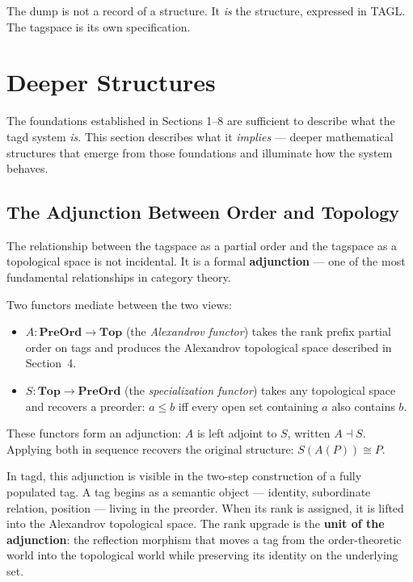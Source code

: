 \documentclass{article}
\begin{document}
The dump is not a record of a structure. It \emph{is} the structure, expressed
in TAGL. The tagspace is its own specification.

\section{Deeper Structures}

The foundations established in Sections 1--8 are sufficient to describe what
the tagd system \emph{is}. This section describes what it \emph{implies} ---
deeper mathematical structures that emerge from those foundations and illuminate
how the system behaves.

\subsection{The Adjunction Between Order and Topology}

The relationship between the tagspace as a partial order and the tagspace as a
topological space is not incidental. It is a formal \textbf{adjunction} --- one
of the most fundamental relationships in category theory.

Two functors mediate between the two views:

\begin{itemize}
  \item $A : \mathbf{PreOrd} \to \mathbf{Top}$ (the \emph{Alexandrov functor})
        takes the rank prefix partial order on tags and produces the Alexandrov
        topological space described in Section~4.
  \item $S : \mathbf{Top} \to \mathbf{PreOrd}$ (the \emph{specialization
        functor}) takes any topological space and recovers a preorder:
        $a \leq b$ iff every open set containing $a$ also contains $b$.
\end{itemize}

These functors form an adjunction: $A$ is left adjoint to $S$, written
$A \dashv S$. Applying both in sequence recovers the original structure:
$S(A(P)) \cong P$.

In tagd, this adjunction is visible in the two-step construction of a fully
populated tag. A tag begins as a semantic object --- identity, subordinate
relation, position --- living in the preorder. When its rank is assigned, it is
lifted into the Alexandrov topological space. The rank upgrade is the
\textbf{unit of the adjunction}: the reflection morphism that moves a tag from
the order-theoretic world into the topological world while preserving its
identity on the underlying set.
\end{document}
